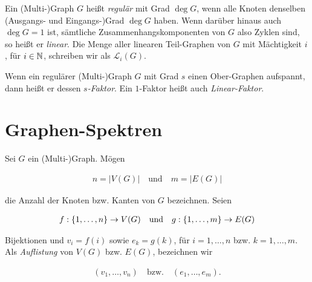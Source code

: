 \begin{definition}
            Ein (Multi-)Graph $G$ heißt \textit{regulär} mit Grad $\deg G$, wenn alle Knoten denselben (Ausgangs- und Eingangs-)Grad $\deg G$ haben.
            Wenn darüber hinaus auch $\deg G = 1$ ist, sämtliche Zusammenhangskomponenten von $G$ also Zyklen sind, so heißt er \textit{linear}.
            Die Menge aller linearen Teil-Graphen von $G$ mit Mächtigkeit $i$, für $i \in \mathbb N$, schreiben wir als $\mathcal L_i(G)$.

            Wenn ein regulärer (Multi-)Graph $G$ mit Grad $s$ einen Ober-Graphen aufspannt, dann heißt er dessen \textit{$s$-Faktor}.
            Ein $1$-Faktor heißt auch \textit{Linear-Faktor}.

        \end{definition}

    \section{Graphen-Spektren}

        \begin{definition} \label{def:listing}

            Sei $G$ ein (Multi-)Graph.
            Mögen

            \begin{align*}
                n = |V(G)|
                \quad
                \text{und}
                \quad
                m = |E(G)|
            \end{align*}

            die Anzahl der Knoten bzw. Kanten von $G$ bezeichnen.
            Seien

            \begin{align*}
                f: {\left \{ 1, \dots, n \right \}} \to V(G)
                \quad
                \text{und}
                \quad
                g: {\left \{ 1, \dots, m \right \}} \to E(G)
            \end{align*}

            Bijektionen und $v_i = f(i)$ sowie $e_k = g(k)$, für $i = 1, \dots, n$ bzw. $k = 1, \dots, m$.
            Als \textit{Auflistung} von $V(G)$ bzw. $E(G)$, bezeichnen wir

            \begin{align*}
                (v_1, \dots, v_n)
                \quad
                \text{bzw.}
                \quad
                (e_1, \dots, e_m).
            \end{align*}

        \end{definition}

